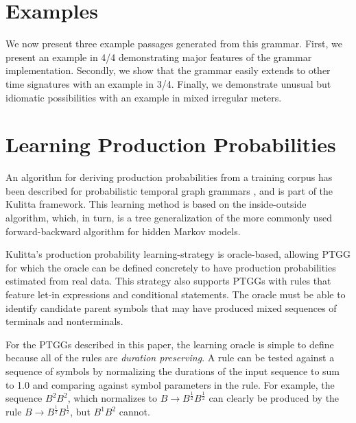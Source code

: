 \documentclass{article}
\begin{document}

\section{Examples}

We now present three example passages generated from this grammar. First, we present an example in 4/4 demonstrating major features of the grammar implementation. Secondly, we show that the grammar easily extends to other time signatures with an example in 3/4. Finally, we demonstrate unusual but idiomatic possibilities with an example in mixed irregular meters.






\section{Learning Production Probabilities}

An algorithm for deriving production probabilities from a training corpus has been described for probabilistic temporal graph grammars \cite{kulitta_learning}, and is part of the Kulitta framework. This learning method is based on the inside-outside algorithm\cite{lari1990}, which, in turn, is a tree generalization of the more commonly used forward-backward algorithm for hidden Markov models.

Kulitta's production probability learning-strategy is oracle-based, allowing PTGG for which the oracle can be defined concretely to have production probabilities estimated from real data. This strategy also supports PTGGs with rules that feature let-in expressions and conditional statements. The oracle must be able to identify candidate parent symbols that may have produced mixed sequences of terminals and nonterminals. 

For the PTGGs described in this paper, the learning oracle is simple to define because all of the rules are \emph{duration preserving}. A rule can be tested against a sequence of symbols by normalizing the durations of the input sequence to sum to 1.0 and comparing against symbol parameters in the rule. For example, the sequence $B^{2}B^{2}$, which normalizes to $B \rightarrow B^\frac{1}{2} B^\frac{1}{2}$ can clearly be produced by the rule $B \rightarrow B^\frac{1}{2} B^\frac{1}{2}$, but $B^{1} B^{2}$ cannot. 
\end{document}
